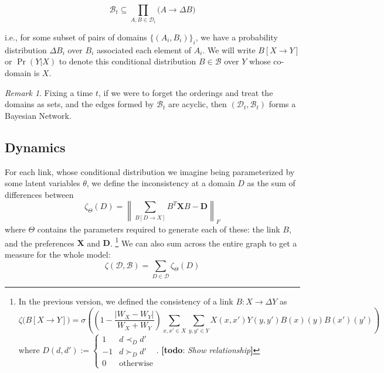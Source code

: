 \documentclass{article}
\theoremstyle{plain}
\theoremstyle{definition}
\theoremstyle{remark}
\newtheorem*{remark}{Remark}
\newcommand{\todo}[1]{{\color{red}\large\textbf{[todo}: {\normalsize\itshape#1}\textbf{]}}}
\newcommand\mat[1]{\mathbf #1}
\begin{document}
	\[  \mathcal B_t \subseteq \prod_{A, B \in \mathcal D_t} \Big( A \to \Delta B \Big) \] 
	
	i.e., for some subset of pairs of domains $\{ (A_i, B_i) \}_i$, we have a probability distribution $\Delta B_i$ over $B_i$ associated each element of $A_i$. We will write $B [X \to Y]$ or $\Pr(Y | X)$ to denote this conditional distribution $B \in \mathcal B$ over $Y$ whose co-domain is $X$.
	
	
	\begin{remark}
		Fixing a time $t$, if we were to forget the orderings and treat the domains as sets, and the edges formed by $\mathcal B_t$ are acyclic, then $(\mathcal D_t, \mathcal B_t)$ forms a Bayesian Network.
	\end{remark}
 
 	
 	
 	\subsection{Dynamics}
	
	
	
	For each link, whose conditional distribution we imagine being parameterized by some latent variables $\theta$, we define the inconsistency at a domain $D$ as the sum of differences between 
	\[ \zeta_\Theta(D) = \left\lVert \sum_{B[D \to X]} B^T \mat X B - \mat D \right\rVert_F \]
	where $\Theta$ contains the parameters required to generate each of these: the link $B$, and the preferences $\mat X$ and $\mat D$.
 	\footnote{In the previous version, we defined the consistency of a link $B : X \to \Delta Y$ as 
 	 	\[ \zeta\big(B[X \to Y]\big) =  \sigma \left( \left(1- \frac{|W_X - W_Y|}{W_X + W_Y}\right) \sum_{x,x' \in X}\sum_{y,y' \in Y} X(x,x') Y(y,y') B(x)(y) B(x')(y') \right) \]
 		where 
 	 	$ D(d, d') := \begin{cases}
 	 		1 & d \prec_D d' \\
 	 		-1 & d \succ_D d' \\
 	 		0 & \text{otherwise}
 	 	\end{cases} $.  \todo{Show relationship}}	
 	We can also sum across the entire graph to get a measure for the whole model:
 	\[ \zeta(\mathcal D, \mathcal B) = \sum_{D \in \mathcal D} \zeta_\Theta(D) \]
 	
\end{document}
